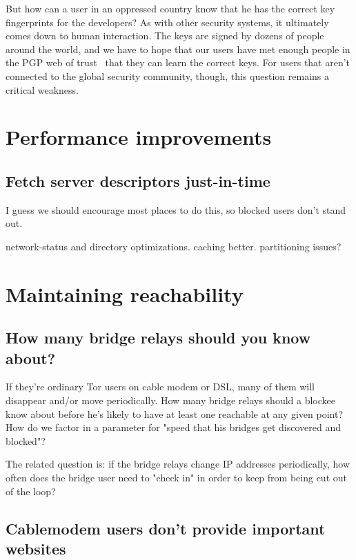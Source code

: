 \documentclass{llncs}
\begin{document}
But how can a user in an oppressed country know that he has the correct
key fingerprints for the developers? As with other security systems, it
ultimately comes down to human interaction. The keys are signed by dozens
of people around the world, and we have to hope that our users have met
enough people in the PGP web of trust~\cite{pgp-wot} that they can learn
the correct keys. For users that aren't connected to the global security
community, though, this question remains a critical weakness.



\section{Performance improvements}
\label{sec:performance}

\subsection{Fetch server descriptors just-in-time}

I guess we should encourage most places to do this, so blocked
users don't stand out.


network-status and directory optimizations. caching better. partitioning
issues?

\section{Maintaining reachability}

\subsection{How many bridge relays should you know about?}

If they're ordinary Tor users on cable modem or DSL, many of them will
disappear and/or move periodically. How many bridge relays should a
blockee know
about before he's likely to have at least one reachable at any given point?
How do we factor in a parameter for "speed that his bridges get discovered
and blocked"?

The related question is: if the bridge relays change IP addresses
periodically, how often does the bridge user need to "check in" in order
to keep from being cut out of the loop?

\subsection{Cablemodem users don't provide important websites}
\label{subsec:block-cable}
\end{document}
